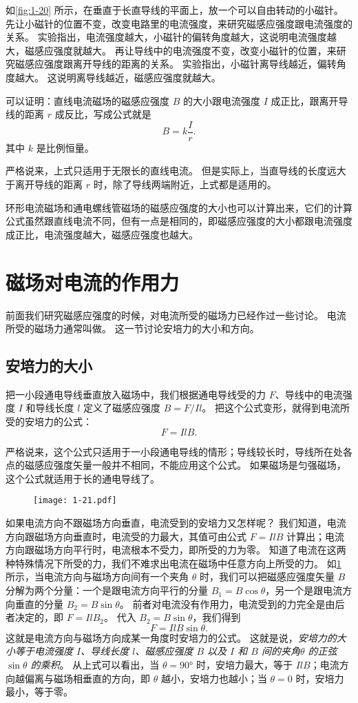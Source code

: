 如\cref{fig:1-20} 所示，在垂直于长直导线的平面上，放一个可以自由转动的小磁针。
先让小磁针的位置不变，改变电路里的电流强度，来研究磁感应强度跟电流强度的关系。
实验指出，电流强度越大，小磁针的偏转角度越大，这说明电流强度越大，磁感应强度就越大。
再让导线中的电流强度不变，改变小磁针的位置，来研究磁感应强度跟离开导线的距离的关系。
实验指出，小磁针离导线越近，偏转角度越大。
这说明离导线越近，磁感应强度就越大。

可以证明：直线电流磁场的磁感应强度 $B$ 的大小跟电流强度 $I$ 成正比，跟离开导线的距离 $r$ 成反比，写成公式就是
\[B=k\frac{I}{r}.\]
其中 $k$ 是比例恒量。

严格说来，上式只适用于无限长的直线电流。
但是实际上，当直导线的长度远大于离开导线的距离 $r$ 时，除了导线两端附近，上式都是适用的。

环形电流磁场和通电螺线管磁场的磁感应强度的大小也可以计算出来，它们的计算公式虽然跟直线电流不同，但有一点是相同的，即磁感应强度的大小都跟电流强度成正比，电流强度越大，磁感应强度也越大。

\section{磁场对电流的作用力}
前面我们研究磁感应强度的时候，对电流所受的磁场力已经作过一些讨论。
电流所受的磁场力通常叫做。
这一节讨论安培力的大小和方向。

\subsection{安培力的大小}
把一小段通电导线垂直放入磁场中，我们根据通电导线受的力 $F$、导线中的电流强度 $I$ 和导线长度 $l$ 定义了磁感应强度 $B=F/Il$。
把这个公式变形，就得到电流所受的安培力的公式：
\[F=Il B.\]

严格说来，这个公式只适用于一小段通电导线的情形；导线较长时，导线所在处各点的磁感应强度矢量一般并不相同，不能应用这个公式。
如果磁场是匀强磁场，这个公式就适用于长的通电导线了。
\begin{figure}
  \texttt{[image: 1-21.pdf]}
	\caption{ }\label{fig:1-21}
\end{figure}

如果电流方向不跟磁场方向垂直，电流受到的安培力又怎样呢？
我们知道，电流方向跟磁场方向垂直时，电流受的力最大，其值可由公式 $F=Il B$ 计算出；电流方向跟磁场方向平行时，电流根本不受力，即所受的力为零。
知道了电流在这两种特殊情况下所受的力，我们不难求出电流在磁场中任意方向上所受的力。
如\cref{fig:1-21} 所示，当电流方向与磁场方向间有一个夹角 $\theta$ 时，我们可以把磁感应强度矢量 $B$ 分解为两个分量：一个是跟电流方向平行的分量 $B_1=B\cos\theta$，另一个是跟电流方向垂直的分量 $B_2=B\sin\theta$。
前者对电流没有作用力，电流受到的力完全是由后者决定的，即 $F=Il B_2$。
代入 $B_2=B\sin\theta$，我们得到
\[F=Il B\sin\theta.\]
这就是电流方向与磁场方向成某一角度时安培力的公式。
这就是说，\emph{安培力的大小等于电流强度 $I$、导线长度 $l$、磁感应强度 $B$ 以及 $I$ 和 $B$ 间的夹角$\theta$ 的正弦 $\sin\theta$ 的乘积}。
从上式可以看出，当 $\theta =\ang{90}$ 时，安培力最大，等于 $Il B$；电流方向越偏离与磁场相垂直的方向，即 $\theta$ 越小，安培力也越小；当 $\theta =0$ 时，安培力最小，等于零。

